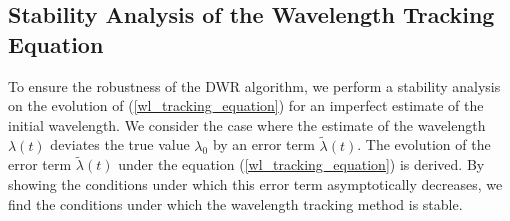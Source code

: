 \documentclass[8pt,a4paper]{report}
\begin{document}
	
	\subsection{Stability Analysis of the Wavelength Tracking Equation}
	To ensure the robustness of the DWR algorithm, we perform a stability analysis on the evolution of (\ref{wl_tracking_equation}) for an imperfect estimate of the initial wavelength. We consider the case where the estimate of the wavelength $\lambda(t)$ deviates the true value $\lambda_0$ by an error term $\tilde{\lambda}(t)$. The evolution of the error term $\tilde{\lambda}(t)$ under the equation (\ref{wl_tracking_equation}) is derived. By showing the conditions under which this error term asymptotically decreases, we find the conditions under which the wavelength tracking method is stable.
	
\end{document}

